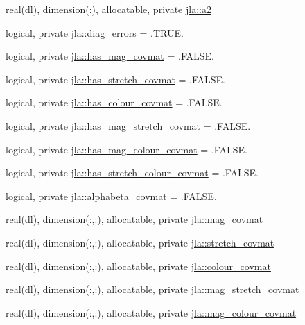 \begin{DoxyCompactItemize}
\item 
real(dl), dimension(\+:), allocatable, private \mbox{\hyperlink{namespacejla_a4745bbeba0b176717566b37123f5a538}{jla\+::a2}}
\item 
logical, private \mbox{\hyperlink{namespacejla_ab5b550ee0d2130dd40e4e517860a32e3}{jla\+::diag\+\_\+errors}} = .T\+R\+U\+E.
\item 
logical, private \mbox{\hyperlink{namespacejla_a59c3668ae4a232ee84a102f4ea2515c1}{jla\+::has\+\_\+mag\+\_\+covmat}} = .F\+A\+L\+S\+E.
\item 
logical, private \mbox{\hyperlink{namespacejla_a41c379420fdf30a15f9f79533c2e9172}{jla\+::has\+\_\+stretch\+\_\+covmat}} = .F\+A\+L\+S\+E.
\item 
logical, private \mbox{\hyperlink{namespacejla_a5f77e309102810deed32022b4986fcd7}{jla\+::has\+\_\+colour\+\_\+covmat}} = .F\+A\+L\+S\+E.
\item 
logical, private \mbox{\hyperlink{namespacejla_a5b83e1587462131ae02f6c91ac9831f3}{jla\+::has\+\_\+mag\+\_\+stretch\+\_\+covmat}} = .F\+A\+L\+S\+E.
\item 
logical, private \mbox{\hyperlink{namespacejla_aab6bb8e29688907bcdf528d8aeb19f04}{jla\+::has\+\_\+mag\+\_\+colour\+\_\+covmat}} = .F\+A\+L\+S\+E.
\item 
logical, private \mbox{\hyperlink{namespacejla_a32dbd6f4ba90d52437050c67650569cc}{jla\+::has\+\_\+stretch\+\_\+colour\+\_\+covmat}} = .F\+A\+L\+S\+E.
\item 
logical, private \mbox{\hyperlink{namespacejla_a337800de4314f7309ac0d0fb2f7a0278}{jla\+::alphabeta\+\_\+covmat}} = .F\+A\+L\+S\+E.
\item 
real(dl), dimension(\+:,\+:), allocatable, private \mbox{\hyperlink{namespacejla_a268b540e94d941747a6f2a4ae9db5fc6}{jla\+::mag\+\_\+covmat}}
\item 
real(dl), dimension(\+:,\+:), allocatable, private \mbox{\hyperlink{namespacejla_a7244bc3fbb6a94e6d1fe9d0e1fbaaef8}{jla\+::stretch\+\_\+covmat}}
\item 
real(dl), dimension(\+:,\+:), allocatable, private \mbox{\hyperlink{namespacejla_a3b95b3e7a5ea31feba90bf7c9b9e8fc6}{jla\+::colour\+\_\+covmat}}
\item 
real(dl), dimension(\+:,\+:), allocatable, private \mbox{\hyperlink{namespacejla_a6d4dd0b09a0e00323bc4f74df2235901}{jla\+::mag\+\_\+stretch\+\_\+covmat}}
\item 
real(dl), dimension(\+:,\+:), allocatable, private \mbox{\hyperlink{namespacejla_a0eab7a6fccee7c07f28748c3bcb2c260}{jla\+::mag\+\_\+colour\+\_\+covmat}}

\end{DoxyCompactItemize}
